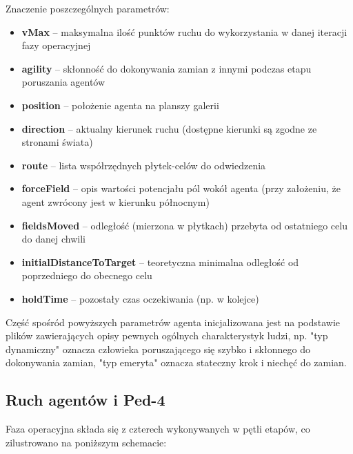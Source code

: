 \documentclass[a4paper, 12pt]{article}
\begin{document}
\noindent
Znaczenie poszczególnych parametrów:
\begin{itemize}
\item \textbf{vMax} – maksymalna ilość punktów ruchu do wykorzystania w danej iteracji fazy operacyjnej
\item \textbf{agility} – skłonność do dokonywania zamian z innymi podczas etapu poruszania agentów
\item \textbf{position} – położenie agenta na planszy galerii
\item \textbf{direction} – aktualny kierunek ruchu (dostępne kierunki są zgodne ze stronami świata)
\item \textbf{route} – lista współrzędnych płytek-celów do odwiedzenia
\item \textbf{forceField} – opis wartości potencjału pól wokół agenta (przy założeniu, że agent zwrócony jest w kierunku północnym)
\item \textbf{fieldsMoved} – odległość (mierzona w płytkach) przebyta od ostatniego celu do danej chwili
\item \textbf{initialDistanceToTarget} – teoretyczna minimalna odległość od poprzedniego do obecnego celu
\item \textbf{holdTime} – pozostały czas oczekiwania (np. w kolejce)
\end{itemize}

Część spośród powyższych parametrów agenta inicjalizowana jest na podstawie plików zawierających opisy pewnych ogólnych charakterystyk ludzi, np. "typ dynamiczny" oznacza człowieka poruszającego się szybko i skłonnego do dokonywania zamian, "typ emeryta" oznacza stateczny krok i niechęć do zamian.

        \subsection{Ruch agentów i Ped-4}
        \label{sec:movement-impl}

\noindent
Faza operacyjna składa się z czterech wykonywanych w pętli etapów, co zilustrowano na poniższym schemacie:
\end{document}
